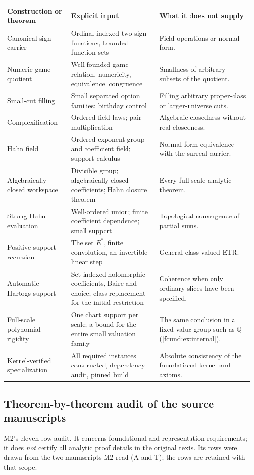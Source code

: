 \documentclass[11pt,letterpaper]{article}
\numberwithin{equation}{section}
\theoremstyle{definition}
\theoremstyle{remark}
\newcommand{\Q}{\mathbb Q}
\begin{document}
\begin{longtable}{@{}P{0.28\textwidth}P{0.34\textwidth}P{0.30\textwidth}@{}}
\toprule
Construction or theorem & Explicit input & What it does not supply\\
\midrule\endhead
Canonical sign carrier & Ordinal-indexed two-sign functions; bounded function sets & Field operations or normal form.\\[0.45em]
Numeric-game quotient & Well-founded game relation, numericity, equivalence, congruence & Smallness of arbitrary subsets of the quotient.\\[0.45em]
Small-cut filling & Small separated option families; birthday control & Filling arbitrary proper-class or larger-universe cuts.\\[0.45em]
Complexification & Ordered-field laws; pair multiplication & Algebraic closedness without real closedness.\\[0.45em]
Hahn field & Ordered exponent group and coefficient field; support calculus & Normal-form equivalence with the surreal carrier.\\[0.45em]
Algebraically closed workspace & Divisible group; algebraically closed coefficients; Hahn closure theorem & Every full-scale analytic theorem.\\[0.45em]
Strong Hahn evaluation & Well-ordered union; finite coefficient dependence; small support & Topological convergence of partial sums.\\[0.45em]
Positive-support recursion & The set $E^*$, finite convolution, an invertible linear step & General class-valued ETR.\\[0.45em]
Automatic Hartogs support & Set-indexed holomorphic coefficients, Baire and choice; class replacement for the initial restriction & Coherence when only ordinary slices have been specified.\\[0.45em]
Full-scale polynomial rigidity & One chart support per scale; a bound for the entire small valuation family & The same conclusion in a fixed value group such as $\Q$ (\cref{found:ex:internal}).\\[0.45em]
Kernel-verified specialization & All required instances constructed, dependency audit, pinned build & Absolute consistency of the foundational kernel and axioms.\\
\bottomrule
\end{longtable}

\subsection{Theorem-by-theorem audit of the source manuscripts}
\label{found:app:theorembytheorem}
M2's eleven-row audit. It concerns foundational and representation
requirements; it does \emph{not} certify all analytic proof details in the
original texts. Its rows were drawn from the two manuscripts M2 read (A and T);
the rows are retained with that scope.
\end{document}
